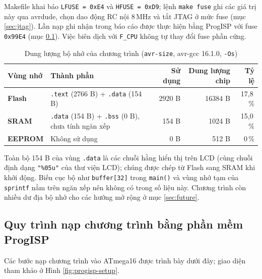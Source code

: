 Makefile khai báo \texttt{LFUSE = 0xE4} và \texttt{HFUSE = 0xD9}; lệnh \texttt{make fuse} ghi các giá trị này qua avrdude, chọn dao động RC nội 8\,MHz và tắt JTAG ở mức fuse (mục \ref{sec:jtag}). Lần nạp ghi nhận trong báo cáo được thực hiện bằng ProgISP với fuse \texttt{0x99E4} (mục \ref{sec:progisp}). Việc biên dịch với \texttt{F\_CPU} không tự thay đổi fuse phần cứng.

\begin{table}[H]
\centering
\small
\caption{Dung lượng bộ nhớ của chương trình (\texttt{avr-size}, avr-gcc 16.1.0, \texttt{-Os})}
\label{tab:memory}
\renewcommand{\arraystretch}{1.15}
\begin{tabularx}{\textwidth}{>{\bfseries}l X r r r}
\toprule
Vùng nhớ & Thành phần & Sử dụng & Dung lượng chip & Tỷ lệ \\
\midrule
Flash & \texttt{.text} (2766 B) + \texttt{.data} (154 B) & 2920 B & 16384 B & 17,8\,\% \\
SRAM & \texttt{.data} (154 B) + \texttt{.bss} (0 B), chưa tính ngăn xếp & 154 B & 1024 B & 15,0\,\% \\
EEPROM & Không sử dụng & 0 B & 512 B & 0\,\% \\
\bottomrule
\end{tabularx}
\end{table}

Toàn bộ 154 B của vùng \texttt{.data} là các chuỗi hằng hiển thị trên LCD (cùng chuỗi định dạng \texttt{"\%05u"} của thư viện LCD); chúng được chép từ Flash sang SRAM khi khởi động. Biến cục bộ như \texttt{buffer[32]} trong \texttt{main()} và vùng nhớ tạm của \texttt{sprintf} nằm trên ngăn xếp nên không có trong số liệu này. Chương trình còn nhiều dư địa bộ nhớ cho các hướng mở rộng ở mục \ref{sec:future}.

\subsection{Quy trình nạp chương trình bằng phần mềm ProgISP}
\label{sec:progisp}

Các bước nạp chương trình vào ATmega16 được trình bày dưới đây; giao diện tham khảo ở Hình \ref{fig:progisp-setup}.

